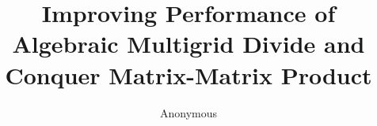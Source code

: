 \documentclass[sigconf]{acmart}
\begin{document}
\title{Improving Performance of Algebraic Multigrid Divide and Conquer Matrix-Matrix Product}

\author{Anonymous}





\end{document}
